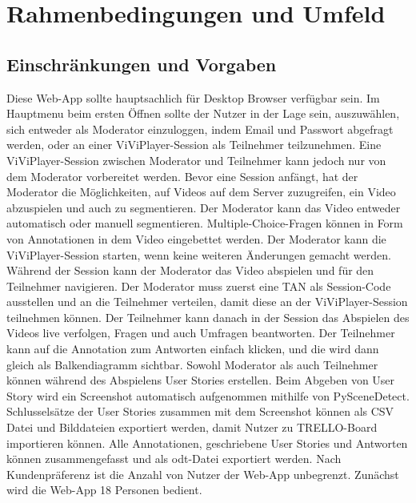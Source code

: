 \section{Rahmenbedingungen und Umfeld}

\subsection{Einschränkungen und Vorgaben}
Diese Web-App sollte hauptsachlich für Desktop Browser verfügbar sein. Im Hauptmenu beim ersten Öffnen sollte der Nutzer in der Lage sein, auszuwählen, sich entweder als Moderator einzuloggen, indem Email und Passwort abgefragt werden, oder an einer ViViPlayer-Session als Teilnehmer teilzunehmen. Eine ViViPlayer-Session zwischen Moderator und Teilnehmer kann jedoch nur von dem Moderator vorbereitet werden.\linebreak
\linebreak
Bevor eine Session anfängt, hat der Moderator die Möglichkeiten, auf Videos auf dem Server zuzugreifen, ein Video abzuspielen und auch zu segmentieren. Der Moderator kann
das Video entweder automatisch oder manuell segmentieren. Multiple-Choice-Fragen können in Form von Annotationen in dem Video eingebettet werden. Der Moderator kann die ViViPlayer-Session starten, wenn keine weiteren Änderungen gemacht werden.\linebreak
\linebreak
Während der Session kann der Moderator das Video abspielen und für den Teilnehmer navigieren. Der Moderator muss zuerst eine TAN als Session-Code ausstellen und an die Teilnehmer verteilen, damit diese an der ViViPlayer-Session teilnehmen können. Der Teilnehmer kann danach in der Session das Abspielen des Videos live verfolgen, Fragen und auch Umfragen beantworten. Der Teilnehmer kann auf die Annotation zum Antworten einfach klicken, und die wird dann gleich als Balkendiagramm sichtbar.
Sowohl Moderator als auch Teilnehmer können während des Abspielens User Stories erstellen. Beim Abgeben von User Story wird ein Screenshot automatisch aufgenommen mithilfe von PySceneDetect. Schlusselsätze der User Stories zusammen mit dem Screenshot können als CSV Datei und Bilddateien exportiert werden, damit Nutzer zu TRELLO-Board importieren können.
Alle Annotationen, geschriebene User Stories und Antworten können zusammengefasst und als odt-Datei exportiert werden.\linebreak
\linebreak
Nach Kundenpräferenz ist die Anzahl von Nutzer der Web-App unbegrenzt. Zunächst wird die Web-App 18 Personen bedient.


